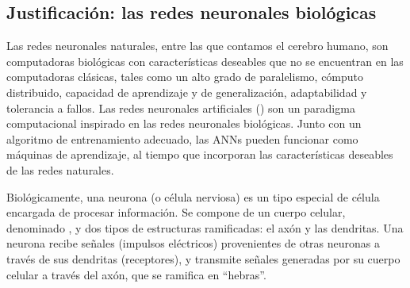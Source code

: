 









%
%
\subsection{Justificación: las redes neuronales biológicas}
%
Las redes neuronales naturales, entre las que contamos el cerebro
humano, son computadoras biológicas con características deseables que
no se encuentran en las computadoras clásicas, tales como un alto
grado de paralelismo, cómputo distribuido, capacidad de aprendizaje y
de generalización, adaptabilidad y tolerancia a fallos.  Las redes
neuronales artificiales () son
un paradigma computacional inspirado en las redes neuronales
biológicas. Junto con un algoritmo de entrenamiento adecuado, las
ANNs pueden funcionar como máquinas de aprendizaje, al tiempo que
incorporan las características deseables de las redes naturales.

Biológicamente, una neurona (o célula nerviosa) es un tipo especial de
célula encargada de procesar información.  Se compone de un cuerpo
celular, denominado , y dos tipos de estructuras ramificadas:
el axón y las dendritas. Una neurona recibe señales (impulsos
eléctricos) provenientes de otras neuronas a través de sus dendritas
(receptores), y transmite señales generadas por su cuerpo celular a
través del axón, que se ramifica en ``hebras''.

